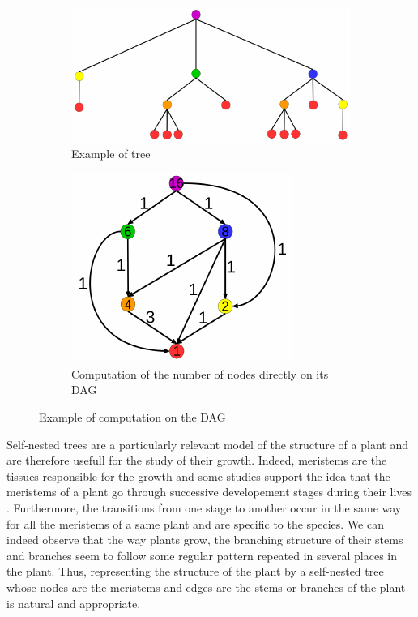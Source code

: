 \begin{figure}[h]
  \centering
  \begin{subfigure}[b]{0.5\textwidth}
    \centering  
    \includegraphics[width=\textwidth]{figures/tree2.pdf}
    \caption{Example of tree}
  \end{subfigure}
  \quad 
  \begin{subfigure}[b]{0.4\textwidth}
    \centering
    \includegraphics[width=.7\textwidth]{figures/dag2_nb_node.pdf}
    \caption{Computation of the number of nodes directly on its DAG}
    \label{fig:computeondag}
  \end{subfigure}
  \caption{Example of computation on the DAG}\label{fig:compute}
\end{figure}

Self-nested trees are a particularly relevant model of the structure
of a plant and are therefore usefull for the study of their
growth. Indeed, meristems are the tissues responsible for the growth
and some studies support the idea that the meristems of a plant go
through successive developement stages during their lives
\cite{meristems}. Furthermore, the transitions from one stage to
another occur in the same way for all the meristems of a same plant
and are specific to the species. We can indeed observe that the way
plants grow, the branching structure of their stems and branches seem
to follow some regular pattern repeated in several places in the
plant. Thus, representing the structure of the plant by a self-nested
tree whose nodes are the meristems and edges are the stems or branches
of the plant is natural and appropriate.

